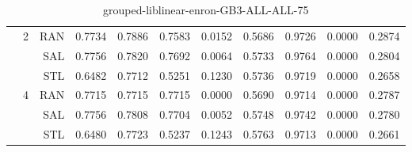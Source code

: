 \begin{center}
\begin{table}[htbp]
\begin{tabular}{ | r | r | r | r | r | r | r | r | r | r | r |}
 & \multirow{3}{*}{2} & RAN & 0.7734 & 0.7886 & 0.7583 & 0.0152 & 0.5686 & 0.9726 & 0.0000 & 0.2874\\ \cline{3-11}
 &   & SAL & 0.7756 & 0.7820 & 0.7692 & 0.0064 & 0.5733 & 0.9764 & 0.0000 & 0.2804\\ \cline{3-11}
 &   & STL & 0.6482 & 0.7712 & 0.5251 & 0.1230 & 0.5736 & 0.9719 & 0.0000 & 0.2658\\ \cline{2-11}
 & \multirow{3}{*}{4} & RAN & 0.7715 & 0.7715 & 0.7715 & 0.0000 & 0.5690 & 0.9714 & 0.0000 & 0.2787\\ \cline{3-11}
 &   & SAL & 0.7756 & 0.7808 & 0.7704 & 0.0052 & 0.5748 & 0.9742 & 0.0000 & 0.2780\\ \cline{3-11}
 &   & STL & 0.6480 & 0.7723 & 0.5237 & 0.1243 & 0.5763 & 0.9713 & 0.0000 & 0.2661\\ \cline{2-11}
\hline
\end{tabular}
\caption{grouped-liblinear-enron-GB3-ALL-ALL-75}
\end{table}
\end{center}

